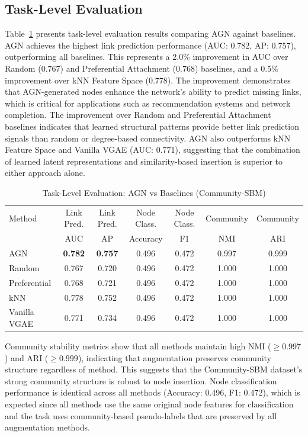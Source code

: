 \documentclass[12pt]{article}
\begin{document}
\subsection{Task-Level Evaluation}

Table~\ref{tab:task_evaluation} presents task-level evaluation results comparing AGN against baselines. AGN achieves the highest link prediction performance (AUC: 0.782, AP: 0.757), outperforming all baselines. This represents a 2.0\% improvement in AUC over Random (0.767) and Preferential Attachment (0.768) baselines, and a 0.5\% improvement over kNN Feature Space (0.778). The improvement demonstrates that AGN-generated nodes enhance the network's ability to predict missing links, which is critical for applications such as recommendation systems and network completion. The improvement over Random and Preferential Attachment baselines indicates that learned structural patterns provide better link prediction signals than random or degree-based connectivity. AGN also outperforms kNN Feature Space and Vanilla VGAE (AUC: 0.771), suggesting that the combination of learned latent representations and similarity-based insertion is superior to either approach alone.

\begin{table}[h]
\centering
\caption{Task-Level Evaluation: AGN vs Baselines (Community-SBM)}
\label{tab:task_evaluation}
\small
\begin{tabular}{lcccccc}
\toprule
Method & Link Pred. & Link Pred. & Node Class. & Node Class. & Community & Community \\
 & AUC & AP & Accuracy & F1 & NMI & ARI \\
\midrule
AGN & \textbf{0.782} & \textbf{0.757} & 0.496 & 0.472 & 0.997 & 0.999 \\
Random & 0.767 & 0.720 & 0.496 & 0.472 & 1.000 & 1.000 \\
Preferential & 0.768 & 0.721 & 0.496 & 0.472 & 1.000 & 1.000 \\
kNN & 0.778 & 0.752 & 0.496 & 0.472 & 1.000 & 1.000 \\
Vanilla VGAE & 0.771 & 0.734 & 0.496 & 0.472 & 1.000 & 1.000 \\
\bottomrule
\end{tabular}
\end{table}

Community stability metrics show that all methods maintain high NMI ($\geq 0.997$) and ARI ($\geq 0.999$), indicating that augmentation preserves community structure regardless of method. This suggests that the Community-SBM dataset's strong community structure is robust to node insertion. Node classification performance is identical across all methods (Accuracy: 0.496, F1: 0.472), which is expected since all methods use the same original node features for classification and the task uses community-based pseudo-labels that are preserved by all augmentation methods.
\end{document}
